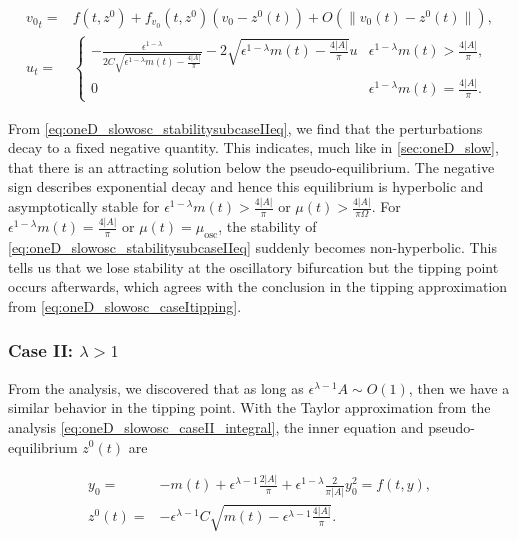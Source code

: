 \begin{equation}\label{eq:oneD_slowosc_stabilitysubcaseIIeq}
\begin{aligned}
{v_0}_t =& f(t,z^0)+f_{v_0}(t,z^0)(v_0-z^0(t))+O(\lVert v_0(t)-z^0(t) \rVert),\\
u_t =&\begin{cases}
-\frac{\epsilon^{1-\lambda}}{2C\sqrt{\epsilon^{1-\lambda}m(t)-\frac{4|A|}{\pi}}}-2\sqrt{\epsilon^{1-\lambda}m(t)-\frac{4|A|}{\pi}} u & \epsilon^{1-\lambda}m(t)>\frac{4|A|}{\pi},\\
0 & \epsilon^{1-\lambda}m(t)=\frac{4|A|}{\pi}.
\end{cases}
\end{aligned}
\end{equation}

\indent From \eqref{eq:oneD_slowosc_stabilitysubcaseIIeq}, we find that the perturbations decay to a fixed negative quantity. This indicates, much like in \autoref{sec:oneD_slow}, that there is an attracting solution below the pseudo-equilibrium. The negative sign describes exponential decay and hence this equilibrium is hyperbolic and asymptotically stable for $\epsilon^{1-\lambda}m(t)>\frac{4|A|}{\pi}$ or $\mu(t)>\frac{4|A|}{\pi \Omega}$. For $\epsilon^{1-\lambda}m(t)=\frac{4|A|}{\pi}$ or $\mu(t) =\mu_{\text{osc}}$, the stability of \eqref{eq:oneD_slowosc_stabilitysubcaseIIeq} suddenly becomes non-hyperbolic. This tells us that we lose stability at the oscillatory bifurcation but the tipping point occurs afterwards, which agrees with the conclusion in the tipping approximation from \eqref{eq:oneD_slowosc_caseItipping}.

\subsubsection{Case II: $\lambda>1$}

From the analysis, we discovered that as long as $\epsilon^{\lambda-1}A\sim O(1)$, then we have a similar behavior in the tipping point. With the Taylor approximation from the analysis \eqref{eq:oneD_slowosc_caseII_integral}, the inner equation and pseudo-equilibrium $z^0(t)$ are

\begin{equation}\label{eq:oneD_slowosc_stabilitycaseII}
\begin{aligned}
y_0=&-m(t) +\epsilon^{\lambda-1}\frac{2|A|}{\pi}+\epsilon^{1-\lambda}\frac{2}{\pi |A|}y_0^2=f(t,y),\\
z^0(t)=&-\epsilon^{\lambda-1}C\sqrt{m(t)-\epsilon^{\lambda-1}\frac{4|A|}{\pi}}.
\end{aligned}
\end{equation}

